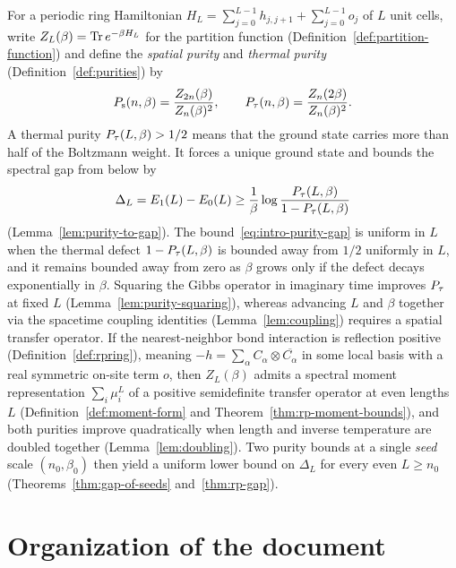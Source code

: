For a periodic ring Hamiltonian \(H_L = \sum_{j=0}^{L-1} h_{j,j+1} + \sum_{j=0}^{L-1} o_j\) of
\(L\) unit cells, write \(Z_L(\beta) = \operatorname{Tr} e^{-\beta H_L}\) for the partition function
(Definition~\ref{def:partition-function}) and define the \emph{spatial purity} and \emph{thermal
  purity} (Definition~\ref{def:purities}) by
\begin{equation}
  \label{eq:intro-purities}
  P_{\mathrm{s}}(n,\beta) = \frac{Z_{2n}(\beta)}{Z_n(\beta)^2}, \qquad
  P_{\tau}(n,\beta) = \frac{Z_n(2\beta)}{Z_n(\beta)^2}.
\end{equation}
A thermal purity \(P_{\tau}(L, \beta) > 1/2\) means that the ground state carries more than half of the
Boltzmann weight. It forces a unique ground state and bounds the spectral gap from below by
\begin{equation}
  \label{eq:intro-purity-gap}
  \Delta_L = E_1(L) - E_0(L) \ge \frac{1}{\beta} \log\frac{P_{\tau}(L, \beta)}{1 - P_{\tau}(L, \beta)}
\end{equation}
(Lemma~\ref{lem:purity-to-gap}). The bound~\eqref{eq:intro-purity-gap} is uniform in \(L\) when the
thermal defect \(1 - P_{\tau}(L, \beta)\) is bounded away from \(1/2\) uniformly in \(L\), and it remains
bounded away from zero as \(\beta\) grows only if the defect decays exponentially in \(\beta\).
Squaring the Gibbs operator in imaginary time improves \(P_{\tau}\) at fixed \(L\)
(Lemma~\ref{lem:purity-squaring}), whereas advancing \(L\) and \(\beta\) together via the spacetime
coupling identities (Lemma~\ref{lem:coupling}) requires a spatial transfer operator. If the
nearest-neighbor bond interaction is reflection positive (Definition~\ref{def:rpring}), meaning
\(-h = \sum_\alpha C_\alpha \otimes \overline{C_\alpha}\) in some local basis with a real symmetric
on-site term \(o\), then \(Z_L(\beta)\) admits a spectral moment representation
\(\sum_i \mu_i^L\) of a positive semidefinite transfer operator at even lengths \(L\)
(Definition~\ref{def:moment-form} and Theorem~\ref{thm:rp-moment-bounds}), and both purities
improve quadratically when length and inverse temperature are doubled together
(Lemma~\ref{lem:doubling}). Two purity bounds at a single \emph{seed} scale \((n_0, \beta_0)\) then
yield a uniform lower bound on \(\Delta_L\) for every even \(L \ge n_0\)
(Theorems~\ref{thm:gap-of-seeds} and~\ref{thm:rp-gap}).

\section{Organization of the document}


